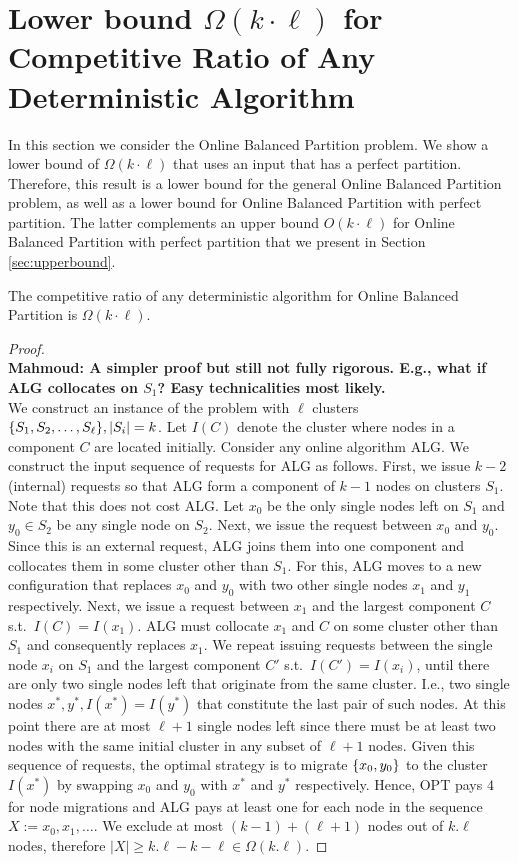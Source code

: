 \documentclass[manuscript,screen=true]{acmart}
\DeclarePairedDelimiter\set{\{}{\}}
\newcommand\mahmoud[1]{\color{green}\textbf{\\ Mahmoud: #1}\\\color{black}}
\begin{document}
\section{Lower bound $\Omega(k\cdot \ell)$ for Competitive Ratio of Any Deterministic Algorithm}


In this section we consider the Online Balanced Partition problem.
We show a lower bound of $\Omega(k \cdot \ell)$ that uses an input that has a perfect partition.
Therefore, this result is a lower bound for the general Online Balanced Partition problem, as well as a lower bound for Online Balanced Partition with perfect partition.
The latter complements an upper bound $O(k \cdot \ell)$ for Online Balanced Partition with perfect partition that we present in Section \ref{sec:upperbound}.

\begin{theorem}
  The competitive ratio of any deterministic algorithm for Online Balanced Partition is $\Omega(k\cdot \ell)$.
\end{theorem}

\begin{proof}
\mahmoud{A simpler proof but still not fully rigorous. E.g., what if ALG collocates on $S_1$? Easy technicalities most likely.}
We construct an instance of the problem with $\ell$ clusters 
$\set{ S_1, S_2,\dots , S_{\ell}}, |S_i|  = k$.
Let $I(C)$ denote the cluster where nodes in a component $C$ are located initially.
Consider any online algorithm ALG.
We construct the input sequence of requests for ALG as follows.
First,
we issue $k-2$ (internal) requests so that ALG form a component of $k-1$
nodes on clusters $S_1$.
Note that this does not cost ALG.
Let $x_0$  be the only single nodes left on $S_1$ and  $y_0 \in S_2$ be any single node on $S_2$.
Next,
we issue the request between $x_0$ and $y_0$.
Since this is an external request,
ALG joins them into one component and collocates them in some cluster other than $S_1$.
For this,
ALG moves to a new configuration that replaces $x_0$ and $y_0$ with two other single nodes $x_1$ and $y_1$ respectively.
Next,
we issue a request between $x_1$ and the largest component $C$ s.t.~$I(C) = I(x_1)$.
ALG must collocate $x_1$ and $C$ on some cluster other than $S_1$ and
consequently replaces $x_1$.
We repeat issuing requests between the single node $x_i$ on $S_1$ and the largest component $C'$ s.t.~$I(C')=I(x_i)$,
 until there are only two single nodes left that  originate from the same cluster.
I.e.,
two single nodes $x^*, y^*,I(x^*) = I(y^*)$
that constitute the last pair of such nodes.
At this point there are at most $\ell+1$ single nodes left
since there must be at least two nodes with the same initial cluster in any subset of $\ell+1$
nodes.
Given this sequence of requests,
the optimal strategy is to migrate $\set{x_0,y_0}$ to the cluster $I(x^*)$ by
 swapping $x_0$ and $y_0$ with $x^*$ and $y^*$ respectively.
Hence,
OPT pays $4$ for node migrations and
ALG pays at least one for each node in the sequence $X := x_0, x_1,\dots$.
We exclude at most $(k-1) + ( \ell+1)$ nodes out of $k.\ell$ nodes,
therefore $|X| \geq k.\ell - k - \ell \in \Omega(k.\ell)$.
\end{proof}
\end{document}
